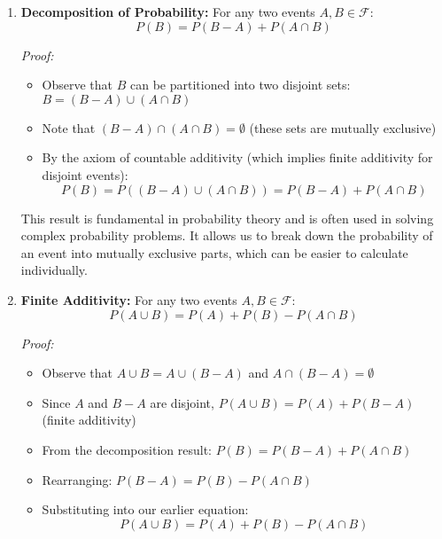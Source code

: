 \documentclass{article}
\begin{document}
\begin{enumerate}  
    \item \textbf{Decomposition of Probability:} For any two events \(A, B \in \mathcal{F}\):
    \[
        P(B) = P(B - A) + P(A \cap B)
    \]

    \textit{Proof:} 
    \begin{itemize}
        \item Observe that \(B\) can be partitioned into two disjoint sets: \(B = (B - A) \cup (A \cap B)\)
        \item Note that \((B - A) \cap (A \cap B) = \emptyset\) (these sets are mutually exclusive)
        \item By the axiom of countable additivity (which implies finite additivity for disjoint events):
        \[P(B) = P((B - A) \cup (A \cap B)) = P(B - A) + P(A \cap B)\]
    \end{itemize}

    This result is fundamental in probability theory and is often used in solving complex probability problems. 
    It allows us to break down the probability of an event into mutually exclusive parts, which can be easier to calculate individually.

    \begin{center}
    \end{center}
    \pagebreak
    \item \textbf{Finite Additivity:} For any two events \(A, B \in \mathcal{F}\):
    \[
        P(A \cup B) = P(A) + P(B) - P(A \cap B)
    \]

    \textit{Proof:}
    \begin{itemize}
        \item Observe that \(A \cup B = A \cup (B - A)\) and \(A \cap (B - A) = \emptyset\)
        \item Since \(A\) and \(B - A\) are disjoint, \(P(A \cup B) = P(A) + P(B - A)\) (finite additivity)
        \item From the decomposition result: \(P(B) = P(B - A) + P(A \cap B)\)
        \item Rearranging: \(P(B - A) = P(B) - P(A \cap B)\)
        \item Substituting into our earlier equation:
              \[P(A \cup B) = P(A) + P(B) - P(A \cap B)\]
    \end{itemize}
    

\end{enumerate}
\end{document}
